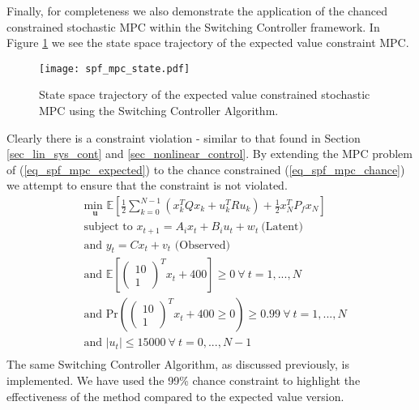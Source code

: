 Finally, for completeness we also demonstrate the application of the chanced constrained stochastic MPC within the Switching Controller framework. In Figure \ref{fig_spf_mpc_state} we see the state space trajectory of the expected value constraint MPC.
\begin{figure}[H] 
\centering
\texttt{[image: spf\_mpc\_state.pdf]}
\caption{State space trajectory of the expected value constrained stochastic MPC using the Switching Controller Algorithm.}
\label{fig_spf_mpc_state}
\end{figure}
Clearly there is a constraint violation - similar to that found in Section \ref{sec_lin_sys_cont} and \ref{sec_nonlinear_control}. By extending the MPC problem of (\ref{eq_spf_mpc_expected}) to the chance constrained (\ref{eq_spf_mpc_chance}) we attempt to ensure that the constraint is not violated. 
\begin{equation}
\begin{aligned}
&\underset{\mathbf{u}}{\text{min }} \mathbb{E}\left[ \frac{1}{2}\sum_{k=0}^{N-1} \left( x_k^TQx_k + u_k^TRu_k \right) + \frac{1}{2}x_N^TP_fx_N \right] \\
& \text{subject to } x_{t+1}=A_ix_t+B_iu_t + w_t~\text{(Latent)} \\
& \text{and } y_{t}= Cx_t + v_t \text{ (Observed)}\\
& \text{and } \mathbb{E}[\begin{pmatrix}
10 \\ 1
\end{pmatrix}^Tx_t + 400] \geq 0 ~\forall ~t=1,...,N \\
& \text{and } \text{Pr}(\begin{pmatrix}
10 \\ 1
\end{pmatrix}^T x_t + 400 \geq 0) \geq 0.99 ~\forall ~t=1,...,N\\
& \text{and } |u_t| \leq 15000 ~\forall ~t=0,...,N-1\\
\end{aligned}
\label{eq_spf_mpc_chance}
\end{equation} 
The same Switching Controller Algorithm, as discussed previously, is implemented. We have used the 99\% chance constraint to highlight the effectiveness of the method compared to the expected value version. 

